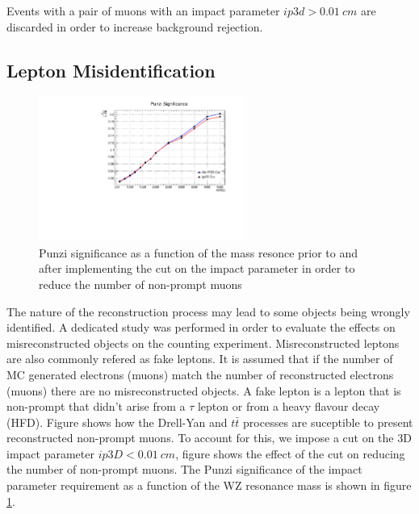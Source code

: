 Events with a pair of muons with an impact parameter $ip3d>0.01~cm$ are
discarded in order to increase background rejection.

\subsection{Lepton Misidentification}


\begin{figure}[tph]
  \centering
  \includegraphics[width=0.6\textwidth]{fig/PunziTest_Ip3DCut.pdf}
  \caption{Punzi significance as a function of the mass resonce prior to and after implementing
    the cut on the impact parameter in order to reduce the number of non-prompt
    muons}
  \label{fig:Punzi_Ip3DCut}
\end{figure}

The nature of the reconstruction process may lead to some objects being
wrongly identified. A dedicated study was performed in order to evaluate
the effects on misreconstructed objects on the counting experiment.
Misreconstructed leptons are also commonly refered as fake leptons. It
is assumed that if the number of MC generated electrons (muons) match
the number of reconstructed electrons (muons) there are no misreconstructed
objects. A fake lepton is a lepton that is non-prompt that didn't arise from
a $\tau$ lepton or from a heavy flavour decay (HFD). Figure %
shows how the Drell-Yan and $t\bar{t}$ processes are suceptible to present
reconstructed non-prompt muons. To account for this, we impose a cut on the
3D impact parameter $ip3D<0.01~cm$, figure %
shows the effect of the cut on reducing the number of non-prompt muons.
The Punzi significance of the impact parameter requirement as a function
of the WZ resonance mass is shown in figure \ref{fig:Punzi_Ip3DCut}. %



